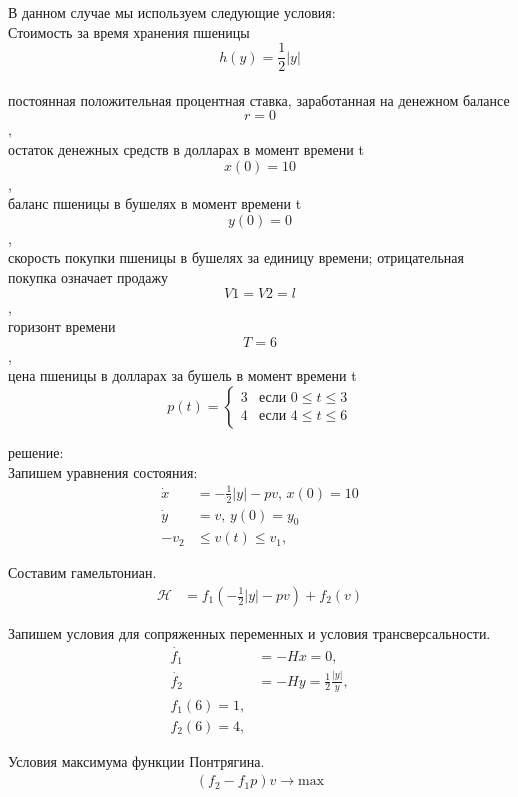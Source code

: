 В данном случае мы используем следующие условия:\\
 Стоимость за время хранения пшеницы $$ h(y) = \frac{1}{2}|y|$$\\
постоянная положительная процентная ставка, заработанная на денежном балансе $$ r = 0 $$,\\
остаток денежных средств в долларах в момент времени t $$ x(0) = 10$$,\\
баланс пшеницы в бушелях в момент времени t $$ y(0) = 0$$,\\
скорость покупки пшеницы в бушелях за единицу времени; отрицательная покупка означает продажу $$ V1 = V2 = l $$,\\
горизонт времени $$ T = 6 $$,\\
цена пшеницы в долларах за бушель в момент времени t
\begin{displaymath}
p(t) =\left\{ \begin{array}{ll}
 3 & \textrm{если $0 \le t\le 3$}\\
 4 & \textrm{если $4  \le t  \le 6$}
  \end{array} \right.
\end{displaymath}


решение:\\

Запишем уравнения состояния:
\begin{align}
    \Dot{x} & = - \frac{1}{2}|y| - p v,\, x(0) = 10 \\
    \Dot{y} & = v, \, y(0) = y_{0} \label{e:one_more} \\
    - v_2 & \le v(t) \le v_1,
\end{align}     

Составим гамельтониан. 
\begin{align}
    \mathcal{H} & = f_{1} (- \frac{1}{2}|y| - p v) + f_{2} (v)
\end{align} 

Запишем условия для сопряженных переменных и условия трансверсальности.
\begin{align}
    \Dot{f_{1}} & = -H x = 0,\\
    \Dot{f_{2}} & = -H y =  \frac{1}{2}\frac{|y|}{y},\\
    {f_{1}(6)} = 1,\\
    {f_{2}(6)} = 4,
\end{align} 

Условия максимума функции Понтрягина.
\begin{align}
    (f_{2} - f_{1} p)v\to \mathrm{max}
\end{align} 

